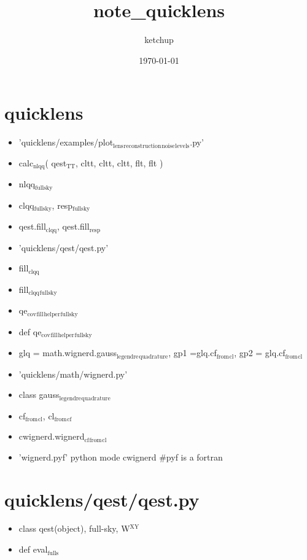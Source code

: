 \documentclass[11pt]{article}
\author{ketchup}
\date{\today}
\title{note\_quicklens}
\begin{document}
\maketitle
\tableofcontents

\section{quicklens}
\label{sec-1}
\begin{itemize}
\item 'quicklens/examples/plot$_{\text{lens}}$$_{\text{reconstruction}}$$_{\text{noise}}$$_{\text{levels}}$.py'
\item calc$_{\text{nlqq}}$( qest$_{\text{TT}}$, cltt, cltt, cltt, flt, flt )
\item nlqq$_{\text{fullsky}}$
\item clqq$_{\text{fullsky}}$, resp$_{\text{fullsky}}$
\item qest.fill$_{\text{clqq}}$, qest.fill$_{\text{resp}}$
\item 'quicklens/qest/qest.py'
\item fill$_{\text{clqq}}$
\item fill$_{\text{clqq}}$$_{\text{fullsky}}$
\item qe$_{\text{cov}}$$_{\text{fill}}$$_{\text{helper}}$$_{\text{fullsky}}$
\item def qe$_{\text{cov}}$$_{\text{fill}}$$_{\text{helper}}$$_{\text{fullsky}}$
\item glq = math.wignerd.gauss$_{\text{legendre}}$$_{\text{quadrature}}$, gp1 =glq.cf$_{\text{from}}$$_{\text{cl}}$, gp2 = glq.cf$_{\text{from}}$$_{\text{cl}}$
\item 'quicklens/math/wignerd.py'
\item class gauss$_{\text{legendre}}$$_{\text{quadrature}}$
\item cf$_{\text{from}}$$_{\text{cl}}$, cl$_{\text{from}}$$_{\text{cf}}$
\item cwignerd.wignerd$_{\text{cf}}$$_{\text{from}}$$_{\text{cl}}$
\item 'wignerd.pyf' python mode cwignerd \#pyf is a fortran
\end{itemize}
\section{quicklens/qest/qest.py}
\label{sec-2}
\begin{itemize}
\item class qest(object), full-sky, W$^{\text{XY}}$
\item def eval$_{\text{fulls}}$
\end{itemize}
\end{document}
